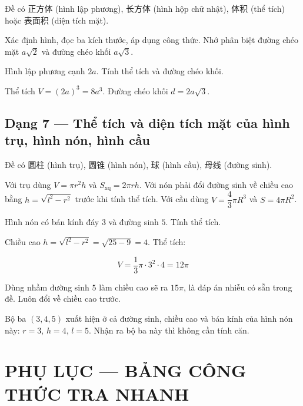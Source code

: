 \documentclass[11pt, a4paper]{article}
\begin{document}
 Đề có 正方体 (hình lập phương), 长方体 (hình hộp chữ nhật), 体积 (thể tích) hoặc 表面积 (diện tích mặt).

 Xác định hình, đọc ba kích thước, áp dụng công thức. Nhớ phân biệt đường chéo mặt $a\sqrt{2}$ và đường chéo khối $a\sqrt{3}$.

\begin{vidu}[{6}]
Hình lập phương cạnh $2a$. Tính thể tích và đường chéo khối.

Thể tích $V = (2a)^3 = 8a^3$. Đường chéo khối $d = 2a\sqrt{3}$.

\end{vidu}
\subsection{Dạng 7 — Thể tích và diện tích mặt của hình trụ, hình nón, hình cầu}

 Đề có 圆柱 (hình trụ), 圆锥 (hình nón), 球 (hình cầu), 母线 (đường sinh).

 Với trụ dùng $V = \pi r^2 h$ và $S_{\text{xq}} = 2\pi rh$. Với nón phải đổi đường sinh về chiều cao bằng $h = \sqrt{l^2-r^2}$ trước khi tính thể tích. Với cầu dùng $V = \dfrac{4}{3}\pi R^3$ và $S = 4\pi R^2$.

\begin{vidu}[{7}]
Hình nón có bán kính đáy $3$ và đường sinh $5$. Tính thể tích.

Chiều cao $h = \sqrt{l^2-r^2} = \sqrt{25-9} = 4$. Thể tích:

$$V = \frac{1}{3}\pi \cdot 3^2 \cdot 4 = 12\pi$$

 Dùng nhầm đường sinh $5$ làm chiều cao sẽ ra $15\pi$, là đáp án nhiễu có sẵn trong đề. Luôn đổi về chiều cao trước.

 Bộ ba $(3, 4, 5)$ xuất hiện ở cả đường sinh, chiều cao và bán kính của hình nón này: $r = 3$, $h = 4$, $l = 5$. Nhận ra bộ ba này thì không cần tính căn.

\end{vidu}
\section{PHỤ LỤC — BẢNG CÔNG THỨC TRA NHANH}
\end{document}
